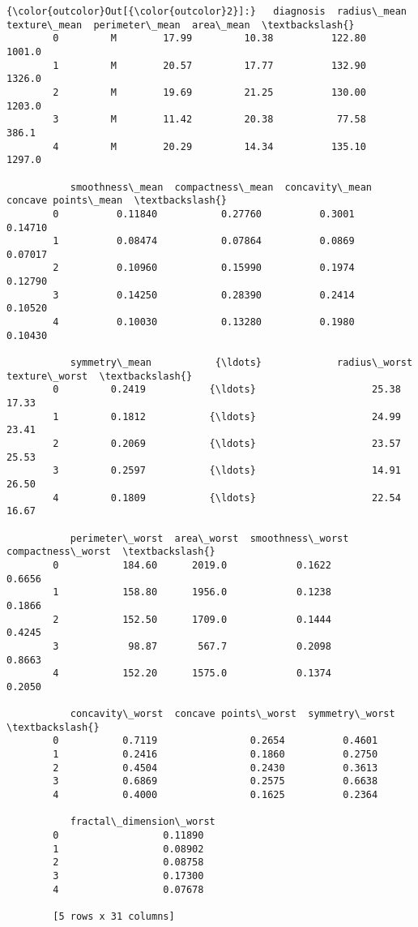 \documentclass[11pt]{article}
\begin{document}
\begin{Verbatim}[commandchars=\\\{\}]
{\color{outcolor}Out[{\color{outcolor}2}]:}   diagnosis  radius\_mean  texture\_mean  perimeter\_mean  area\_mean  \textbackslash{}
        0         M        17.99         10.38          122.80     1001.0   
        1         M        20.57         17.77          132.90     1326.0   
        2         M        19.69         21.25          130.00     1203.0   
        3         M        11.42         20.38           77.58      386.1   
        4         M        20.29         14.34          135.10     1297.0   
        
           smoothness\_mean  compactness\_mean  concavity\_mean  concave points\_mean  \textbackslash{}
        0          0.11840           0.27760          0.3001              0.14710   
        1          0.08474           0.07864          0.0869              0.07017   
        2          0.10960           0.15990          0.1974              0.12790   
        3          0.14250           0.28390          0.2414              0.10520   
        4          0.10030           0.13280          0.1980              0.10430   
        
           symmetry\_mean           {\ldots}             radius\_worst  texture\_worst  \textbackslash{}
        0         0.2419           {\ldots}                    25.38          17.33   
        1         0.1812           {\ldots}                    24.99          23.41   
        2         0.2069           {\ldots}                    23.57          25.53   
        3         0.2597           {\ldots}                    14.91          26.50   
        4         0.1809           {\ldots}                    22.54          16.67   
        
           perimeter\_worst  area\_worst  smoothness\_worst  compactness\_worst  \textbackslash{}
        0           184.60      2019.0            0.1622             0.6656   
        1           158.80      1956.0            0.1238             0.1866   
        2           152.50      1709.0            0.1444             0.4245   
        3            98.87       567.7            0.2098             0.8663   
        4           152.20      1575.0            0.1374             0.2050   
        
           concavity\_worst  concave points\_worst  symmetry\_worst  \textbackslash{}
        0           0.7119                0.2654          0.4601   
        1           0.2416                0.1860          0.2750   
        2           0.4504                0.2430          0.3613   
        3           0.6869                0.2575          0.6638   
        4           0.4000                0.1625          0.2364   
        
           fractal\_dimension\_worst  
        0                  0.11890  
        1                  0.08902  
        2                  0.08758  
        3                  0.17300  
        4                  0.07678  
        
        [5 rows x 31 columns]
\end{Verbatim}
            
\end{document}
